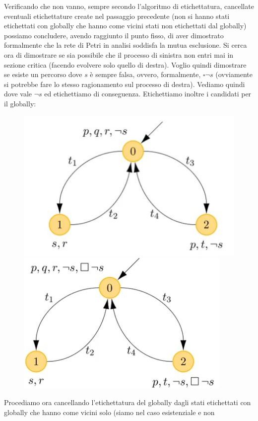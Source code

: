 \documentclass[a4paper,12pt, oneside]{book}
\begin{document}
Verificando che non vanno, sempre secondo l'algoritmo di etichettatura,
cancellate eventuali etichettature create nel passaggio precedente (non si hanno
stati etichettati con globally che hanno come vicini stati non etichettati dal
globally) possiamo concludere, avendo raggiunto il punto fisso,  di aver
dimostrato formalmente che la rete di Petri in analisi soddisfa la mutua
esclusione.
Si cerca ora di dimostrare se sia possibile che il processo di sinistra non
entri mai in sezione critica (facendo evolvere solo quello di destra). Voglio
quindi dimostrare se esiste un percorso dove $s$ è sempre falsa, ovvero,
formalmente, $\square\neg s$ (ovviamente si potrebbe fare lo stesso ragionamento
sul processo di destra).
Vediamo quindi dove vale $\neg s$ ed etichettiamo di conseguenza. Etichettiamo
inoltre i candidati per il globally:
\begin{figure}[H]
  \centering
  \includegraphics[scale = 0.4]{img/me5.jpg}
  \includegraphics[scale = 0.4]{img/me6.jpg}
\end{figure}
Procediamo ora cancellando l'etichettatura del globally dagli stati etichettati
con globally che hanno come vicini solo (siamo nel caso esistenziale e non
\end{document}
